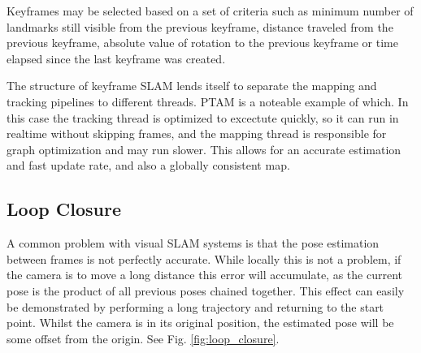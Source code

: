 Keyframes may be selected based on a set of criteria such as minimum number of landmarks still visible from the previous keyframe, distance traveled from the previous keyframe, absolute value of rotation to the previous keyframe or time elapsed since the last keyframe was created. 

The structure of keyframe SLAM lends itself to separate the mapping and tracking pipelines to different threads.  PTAM is a noteable example of which.  In this case the tracking thread is optimized to excectute quickly, so it can run in realtime without skipping frames, and the mapping thread is responsible for graph optimization and may run slower.  This allows for an accurate estimation and fast update rate, and also a globally consistent map.



\subsection{Loop Closure}
\label{subsec:loop_closure}

A common problem with visual SLAM systems is that the pose estimation between frames is not perfectly accurate.  While locally this is not a problem, if the camera is to move a long distance this error will accumulate, as the current pose is the product of all previous poses chained together.  This effect can easily be demonstrated by performing a long trajectory and returning to the start point.  Whilst the camera is in its original position, the estimated pose will be some offset from the origin. See Fig. \ref{fig:loop_closure}.

